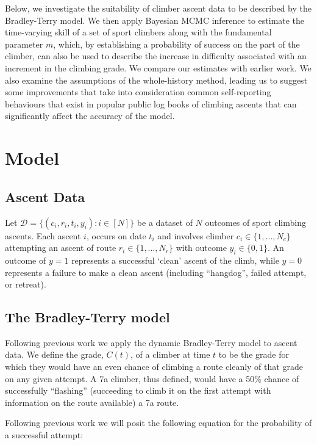 \documentclass[12pt]{article}
\begin{document}
Below, we investigate the suitability of climber ascent data to be described by the Bradley-Terry model.  We then apply Bayesian MCMC inference to estimate the time-varying skill of a set of sport climbers along with the fundamental parameter $m$, which, by establishing a probability of success on the part of the climber, can also be used to describe the increase in difficulty associated with an increment in the climbing grade.  We compare our estimates with earlier work.  We also examine the assumptions of the whole-history method, leading us to suggest some improvements that take into consideration common self-reporting behaviours that exist in popular public log books of climbing ascents that can significantly affect the accuracy of the model.

\section{Model}

\subsection{Ascent Data}

Let $\mathcal{D} = \{(c_i, r_i, t_i, y_i) : i \in [N]\}$ be a dataset of $N$ outcomes of sport climbing ascents.  Each ascent $i$, occurs on date $t_i$ and involves climber $c_i \in \{1,\dots, N_c\}$ attempting an ascent of route $r_i \in \{1,\dots, N_r\}$ with outcome $y_i \in \{0,1\}$. An outcome of $y=1$ represents a successful `clean' ascent of the climb, while $y=0$ represents a failure to make a clean ascent (including ``\gls{hangdog}'', failed attempt, or retreat).

\subsection{The Bradley-Terry model}

Following previous work  \citep{scarff2020estimation} we apply the dynamic Bradley-Terry model \citep{zermelo1929berechnung,bradley1952rank} to ascent data. We define the grade, $C(t)$, of a climber at time $t$ to be the grade for which they would have an even chance of climbing a route cleanly of that grade on any given attempt. A 7a climber, thus defined, would have a 50\% chance of successfully ``flashing'' (succeeding to climb it on the first attempt with information on the route available) a 7a route.

Following previous work \citep{scarff2020estimation} we will posit the following equation for the probability of a successful attempt:
\end{document}
